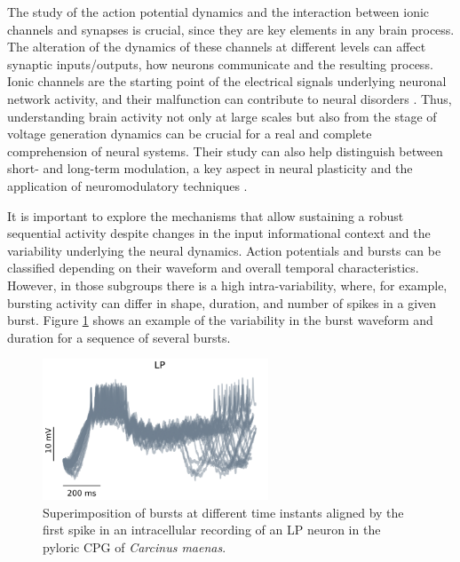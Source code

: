 The study of the action potential dynamics and the interaction between ionic channels and synapses is crucial, since they are key elements in any brain process. The alteration of the dynamics of these channels at different levels can affect synaptic inputs/outputs, how neurons communicate and the resulting process. Ionic channels are the starting point of the electrical signals underlying neuronal network activity, and their malfunction can contribute to neural disorders \parencite{kecskes_editorial_2023}. Thus, understanding brain activity not only at large scales but also from the stage of voltage generation dynamics can be crucial for a real and complete comprehension of neural systems. Their study can also help distinguish between short- and long-term modulation, a key aspect in neural plasticity and the application of neuromodulatory techniques \parencite{chambers_lightactivated_2008,burke_modulation_2019}.

 
It is important to explore the mechanisms that allow sustaining a robust sequential activity despite changes in the input informational context and the variability underlying the neural dynamics. Action potentials and bursts can be classified depending on their waveform and overall temporal characteristics. However, in those subgroups there is a high intra-variability, where, for example, bursting activity can differ in shape,  duration, and number of spikes in a given burst. Figure \ref{fig:burst variability} shows an example of the variability in the burst waveform and duration for a sequence of several bursts. 


\begin{figure}[htb!]
	\centering
	\includegraphics[width=0.6\textwidth]{img/intro/burst_variability.png}
	\caption{Superimposition of bursts at different time instants aligned by the first spike in an intracellular recording of an LP neuron in the pyloric CPG of \textit{Carcinus maenas}.}
	\label{fig:burst variability}
\end{figure}

